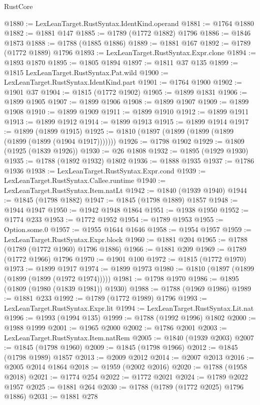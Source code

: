 \begin{lexlean}{RustCore}
\begin{coremodule}
@1880 := LexLeanTarget.RustSyntax.IdentKind.operand
@1881 := @1764 @1880
@1882 := @1881 @147
@1885 := @1789 (@1772 @1882) @1796
@1886 := @1846 @1873
@1888 := @1788 (@1885 @1886)
@1889 := @1881 @167
@1892 := @1789 (@1772 @1889) @1796
@1893 := LexLeanTarget.RustSyntax.Expr.clone
@1894 := @1893 @1870
@1895 := @1805 @1894
@1897 := @1811 @37 @135
@1899 := @1815 LexLeanTarget.RustSyntax.Pat.wild
@1900 := LexLeanTarget.RustSyntax.IdentKind.part
@1901 := @1764 @1900
@1902 := @1901 @37
@1904 := @1815 (@1772 @1902)
@1905 := @1899 @1831
@1906 := @1899 @1905
@1907 := @1899 @1906
@1908 := @1899 @1907
@1909 := @1899 @1908
@1910 := @1899 @1909
@1911 := @1899 @1910
@1912 := @1899 @1911
@1913 := @1899 @1912
@1914 := @1899 @1913
@1915 := @1899 @1914
@1917 := @1899 (@1899 @1915)
@1925 := @1810 (@1897 (@1899 (@1899 (@1899 (@1899 (@1899 (@1904 @1917)))))))
@1926 := @1798 @1902
@1929 := @1809 (@1925 (@1839 @1926))
@1930 := @26 @1808
@1932 := @1895 (@1929 @1930)
@1935 := @1788 (@1892 @1932) @1802
@1936 := @1888 @1935
@1937 := @1786 @1936
@1938 := LexLeanTarget.RustSyntax.Expr.cond
@1939 := LexLeanTarget.RustSyntax.Callee.runtime
@1940 := LexLeanTarget.RustSyntax.Item.natLt
@1942 := @1840 (@1939 @1940)
@1944 := @1845 (@1798 @1882)
@1947 := @1845 (@1798 @1889) @1857
@1948 := @1944 @1947
@1950 := @1942 @1948 @1864
@1951 := @1938 @1950
@1952 := @1774 @233
@1953 := @1772 @1952
@1954 := @1789 @1953
@1955 := Option.some.{0}
@1957 := @1955 @1644 @1646
@1958 := @1954 @1957
@1959 := LexLeanTarget.RustSyntax.Expr.block
@1960 := @1881 @204
@1965 := @1788 (@1789 (@1772 @1960) @1796 @1886)
@1966 := @1881 @209
@1969 := @1789 (@1772 @1966) @1796
@1970 := @1901 @100
@1972 := @1815 (@1772 @1970)
@1973 := @1899 @1917
@1974 := @1899 @1973
@1980 := @1810 (@1897 (@1899 (@1899 (@1899 (@1972 @1974)))))
@1981 := @1798 @1970
@1986 := @1895 (@1809 (@1980 (@1839 @1981)) @1930)
@1988 := @1788 (@1969 @1986)
@1989 := @1881 @233
@1992 := @1789 (@1772 @1989) @1796
@1993 := LexLeanTarget.RustSyntax.Expr.lit
@1994 := LexLeanTarget.RustSyntax.Lit.nat
@1996 := @1993 (@1994 @135)
@1999 := @1788 (@1992 @1996) @1802
@2000 := @1988 @1999
@2001 := @1965 @2000
@2002 := @1786 @2001
@2003 := LexLeanTarget.RustSyntax.Item.natRem
@2005 := @1840 (@1939 @2003)
@2007 := @1845 (@1798 @1960)
@2009 := @1845 (@1798 @1966)
@2012 := @1845 (@1798 @1989) @1857
@2013 := @2009 @2012
@2014 := @2007 @2013
@2016 := @2005 @2014 @1864
@2018 := @1959 (@2002 @2016)
@2020 := @1788 (@1958 @2018)
@2021 := @1774 @254
@2022 := @1772 @2021
@2024 := @1789 @2022 @1957
@2025 := @1881 @264
@2030 := @1788 (@1789 (@1772 @2025) @1796 @1886)
@2031 := @1881 @278

\end{coremodule}
\end{lexlean}
